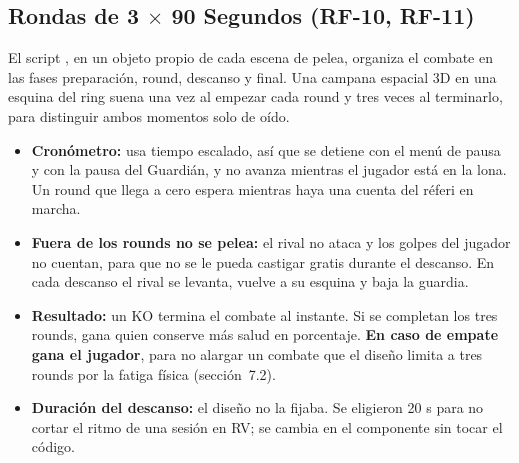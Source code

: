 \subsection{Rondas de 3 $\times$ 90 Segundos (RF-10, RF-11)}
\label{sec:rondas}
El script , en un objeto propio de cada escena de pelea, organiza el combate en las fases preparación, round, descanso y final. Una campana espacial 3D en una esquina del ring suena una vez al empezar cada round y tres veces al terminarlo, para distinguir ambos momentos solo de oído.

\begin{table}[H]
\centering
\caption{Parámetros de las rondas.}
\end{table}

\begin{itemize}
  \item \textbf{Cronómetro:} usa tiempo escalado, así que se detiene con el menú de pausa y con la pausa del Guardián, y no avanza mientras el jugador está en la lona. Un round que llega a cero espera mientras haya una cuenta del réferi en marcha.
  \item \textbf{Fuera de los rounds no se pelea:} el rival no ataca y los golpes del jugador no cuentan, para que no se le pueda castigar gratis durante el descanso. En cada descanso el rival se levanta, vuelve a su esquina y baja la guardia.
  \item \textbf{Resultado:} un KO termina el combate al instante. Si se completan los tres rounds, gana quien conserve más salud en porcentaje. \textbf{En caso de empate gana el jugador}, para no alargar un combate que el diseño limita a tres rounds por la fatiga física (sección~7.2).
  \item \textbf{Duración del descanso:} el diseño no la fijaba. Se eligieron 20 s para no cortar el ritmo de una sesión en RV; se cambia en el componente sin tocar el código.
\end{itemize}

